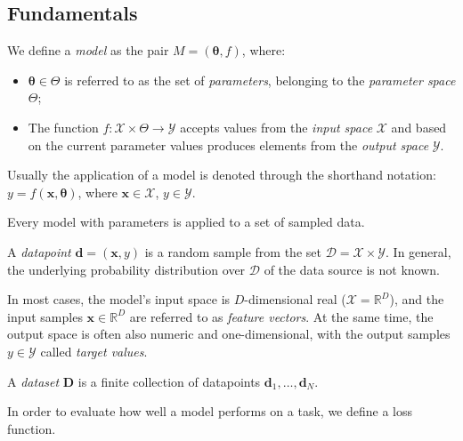 \subsection{Fundamentals}

\begin{definition}
We define a \emph{model} as the pair $M = (\pmb{\theta}, f)$, where:
\begin{itemize}
\item $\pmb{\theta} \in \Theta$ is referred to as the set of \emph{parameters}, belonging to the \emph{parameter space} $\Theta$;
\item The function $f: \mathcal{X} \times \Theta \to \mathcal{Y}$ accepts values from the \emph{input space} $\mathcal{X}$ and based on the current parameter values produces elements from the \emph{output space} $\mathcal{Y}$.
\end{itemize}
Usually the application of a model is denoted through the shorthand notation:\\ $y = f(\pmb{x}, \pmb{\theta})$, where $\pmb{x} \in \mathcal{X}$, $y \in \mathcal{Y}$.
\end{definition}

Every model with parameters is applied to a set of sampled data.

\begin{definition}
A \emph{datapoint} $\pmb{d}=(\pmb{x}, y)$ is a random sample from the set $\mathcal{D} = \mathcal{X} \times \mathcal{Y}$. In general, the underlying probability distribution over $\mathcal{D}$ of the data source is not known. 

In most cases, the model's input space is $D$-dimensional real ($\mathcal{X}=\mathbb{R}^D$), and the input samples $\pmb{x} \in \mathbb{R}^D$ are referred to as \emph{feature vectors}. At the same time, the output space is often also numeric and one-dimensional, with the output samples $y \in \mathcal{Y}$ called \emph{target values}.  

A \emph{dataset} $\pmb{D}$ is a finite collection of datapoints $\pmb{d}_1,\dots,\pmb{d}_N$.
\end{definition}

In order to evaluate how well a model performs on a task, we define a loss function.


